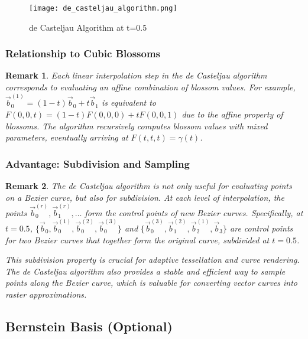 \documentclass{article}
\newtheorem{remark}{Remark}
\begin{document}
\begin{figure}[h]
\centering
\texttt{[image: de\_casteljau\_algorithm.png]}
\caption{de Casteljau Algorithm at t=0.5}
\label{fig:de_casteljau_algorithm}
\end{figure}


\subsubsection{Relationship to Cubic Blossoms}

\begin{remark}
Each linear interpolation step in the de Casteljau algorithm corresponds to evaluating an affine combination of blossom values. For example, \(\vec{b}_0^{(1)} = (1-t) \vec{b}_0 + t \vec{b}_1\) is equivalent to \(F(0, 0, t) = (1-t)F(0, 0, 0) + tF(0, 0, 1)\) due to the affine property of blossoms. The algorithm recursively computes blossom values with mixed parameters, eventually arriving at \(F(t, t, t) = \gamma(t)\).
\end{remark}

\subsubsection{Advantage: Subdivision and Sampling}

\begin{remark}
The de Casteljau algorithm is not only useful for evaluating points on a Bezier curve, but also for subdivision. At each level of interpolation, the points \(\vec{b}_0^{(r)}, \vec{b}_1^{(r)}, \ldots\) form the control points of new Bezier curves.  Specifically, at \(t = 0.5\), \(\{\vec{b}_0, \vec{b}_0^{(1)}, \vec{b}_0^{(2)}, \vec{b}_0^{(3)}\}\) and \(\{\vec{b}_0^{(3)}, \vec{b}_1^{(2)}, \vec{b}_2^{(1)}, \vec{b}_3\}\) are control points for two Bezier curves that together form the original curve, subdivided at \(t=0.5\).

This subdivision property is crucial for adaptive tessellation and curve rendering.  The de Casteljau algorithm also provides a stable and efficient way to sample points along the Bezier curve, which is valuable for converting vector curves into raster approximations.
\end{remark}

\subsection{Bernstein Basis (Optional)}
\end{document}
